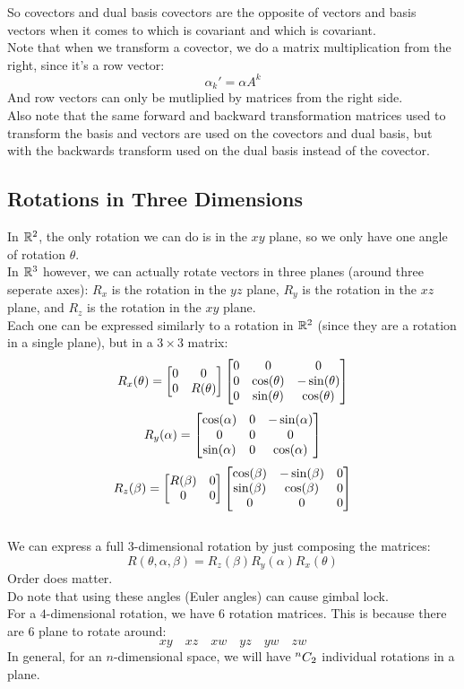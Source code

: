 \documentclass[12pt]{article}
\begin{document}
So covectors and dual basis covectors
are the opposite of vectors and basis vectors
when it comes to which is covariant and
which is covariant. \\

Note that when we transform a covector,
we do a matrix multiplication from
the right, since it's a row vector:
\[ \alpha_k' = \alpha A^k \]
And row vectors can only be mutliplied
by matrices from the right side. \\

Also note that the same forward and backward
transformation matrices used to transform
the basis and vectors are used 
on the covectors and dual basis,
but with the backwards transform used
on the dual basis instead of the covector. \\

\newpage

\subsection*{Rotations in Three Dimensions}

In $\mathbb{R}^2$,
the only rotation we can do is in the $xy$ plane,
so we only have one angle of rotation $\theta$. \\

In $\mathbb{R}^3$ however,
we can actually rotate vectors in three planes
(around three seperate axes):
$R_x$ is the rotation in the $yz$ plane,
$R_y$ is the rotation in the $xz$ plane,
and $R_z$ is the rotation in the $xy$ plane. \\

Each one can be expressed similarly to 
a rotation in $\mathbb{R}^2$ (since they are a rotation
in a single plane), but in a $3\times 3$ matrix:
\[ R_x(\theta) = \begin{bmatrix} 0 & 0 \\ 0 & R(\theta) \end{bmatrix}
\begin{bmatrix} 0 & 0 & 0 \\ 0 & \cos(\theta) & -\sin(\theta) \\ 0 & \sin(\theta) & \cos(\theta) \end{bmatrix} \]
\[ R_y(\alpha) =
\begin{bmatrix} \cos(\alpha) & 0 & -\sin(\alpha) \\ 0 & 0 & 0 \\ \sin(\alpha) & 0 & \cos(\alpha) \end{bmatrix} \]
\[ R_z(\beta) = \begin{bmatrix} R(\beta) & 0 \\ 0 & 0 \end{bmatrix}
\begin{bmatrix} \cos(\beta) & -\sin(\beta) & 0 \\ \sin(\beta) & \cos(\beta) & 0 \\ 0 & 0 & 0 \end{bmatrix} \] \\

We can express a full $3$-dimensional rotation
by just composing the matrices:
\[ R(\theta, \alpha, \beta) = 
R_z(\beta)R_y(\alpha)R_x(\theta) \]
Order does matter. \\
Do note that using these angles 
(Euler angles) can cause gimbal lock. \\

For a $4$-dimensional rotation, we have $6$
rotation matrices. 
This is because there are $6$ plane to rotate
around:
\[ xy \quad xz \quad xw \quad
yz \quad yw \quad zw \] 
In general, for an $n$-dimensional space,
we will have ${}^{n}C_{2}$ individual
rotations in a plane. \\
\end{document}
